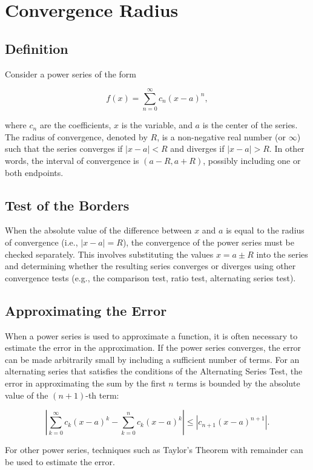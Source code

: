 \newpage
\section{Convergence Radius}

\subsection{Definition}

Consider a power series of the form

\[
    f(x) = \sum_{n=0}^{\infty} c_n {(x - a)}^n,
\]

where \(c_n\) are the coefficients, \(x\) is the variable, and \(a\) is the center of the series. The radius of convergence, denoted by \(R\), is a non-negative real number (or \(\infty\)) such that the series converges if \(|x - a| < R\) and diverges if \(|x - a| > R\). In other words, the interval of convergence is \((a - R, a + R)\), possibly including one or both endpoints.

\subsection{Test of the Borders}

When the absolute value of the difference between \(x\) and \(a\) is equal to the radius of convergence (i.e., \(|x - a| = R\)), the convergence of the power series must be checked separately. This involves substituting the values \(x = a \pm R\) into the series and determining whether the resulting series converges or diverges using other convergence tests (e.g., the comparison test, ratio test, alternating series test).

\subsection{Approximating the Error}

When a power series is used to approximate a function, it is often necessary to estimate the error in the approximation. If the power series converges, the error can be made arbitrarily small by including a sufficient number of terms. For an alternating series that satisfies the conditions of the Alternating Series Test, the error in approximating the sum by the first \(n\) terms is bounded by the absolute value of the \((n+1)\)-th term:

\[
    \left| \sum_{k=0}^{\infty} c_k {(x - a)}^k - \sum_{k=0}^{n} c_k {(x - a)}^k \right| \leq |c_{n+1} {(x - a)}^{n+1}|.
\]

For other power series, techniques such as Taylor's Theorem with remainder can be used to estimate the error.
